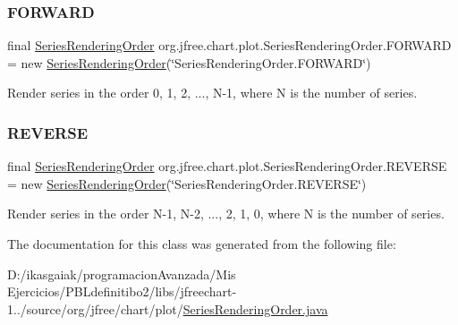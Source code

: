 \subsubsection{\texorpdfstring{F\+O\+R\+W\+A\+RD}{FORWARD}}
{\footnotesize\ttfamily final \mbox{\hyperlink{classorg_1_1jfree_1_1chart_1_1plot_1_1_series_rendering_order}{Series\+Rendering\+Order}} org.\+jfree.\+chart.\+plot.\+Series\+Rendering\+Order.\+F\+O\+R\+W\+A\+RD = new \mbox{\hyperlink{classorg_1_1jfree_1_1chart_1_1plot_1_1_series_rendering_order}{Series\+Rendering\+Order}}(\char`\"{}Series\+Rendering\+Order.\+F\+O\+R\+W\+A\+RD\char`\"{})\hspace{0.3cm}{\ttfamily [static]}}

Render series in the order 0, 1, 2, ..., N-\/1, where N is the number of series. \mbox{\label{classorg_1_1jfree_1_1chart_1_1plot_1_1_series_rendering_order_a4421c646d6a20026793d2e6f6b3a3f49}} 
\subsubsection{\texorpdfstring{R\+E\+V\+E\+R\+SE}{REVERSE}}
{\footnotesize\ttfamily final \mbox{\hyperlink{classorg_1_1jfree_1_1chart_1_1plot_1_1_series_rendering_order}{Series\+Rendering\+Order}} org.\+jfree.\+chart.\+plot.\+Series\+Rendering\+Order.\+R\+E\+V\+E\+R\+SE = new \mbox{\hyperlink{classorg_1_1jfree_1_1chart_1_1plot_1_1_series_rendering_order}{Series\+Rendering\+Order}}(\char`\"{}Series\+Rendering\+Order.\+R\+E\+V\+E\+R\+SE\char`\"{})\hspace{0.3cm}{\ttfamily [static]}}

Render series in the order N-\/1, N-\/2, ..., 2, 1, 0, where N is the number of series. 

The documentation for this class was generated from the following file\+:\begin{DoxyCompactItemize}
\item 
D\+:/ikasgaiak/programacion\+Avanzada/\+Mis Ejercicios/\+P\+B\+Ldefinitibo2/libs/jfreechart-\/1../source/org/jfree/chart/plot/\mbox{\hyperlink{_series_rendering_order_8java}{Series\+Rendering\+Order.\+java}}\end{DoxyCompactItemize}
